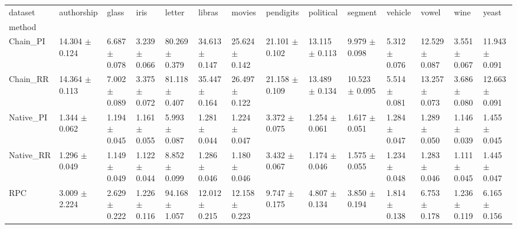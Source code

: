 \begin{tabular}{llllllllllllll}
\toprule
dataset &            authorship &                glass &                 iris &                letter &                libras &                movies &             pendigits &             political &               segment &              vehicle &                 vowel &                 wine &                 yeast \\
method    &                       &                      &                      &                       &                       &                       &                       &                       &                       &                      &                       &                      &                       \\
\midrule
Chain_PI  &  14.304 $ \pm $ 0.124 &  6.687 $ \pm $ 0.078 &  3.239 $ \pm $ 0.066 &  80.269 $ \pm $ 0.379 &  34.613 $ \pm $ 0.147 &  25.624 $ \pm $ 0.142 &  21.101 $ \pm $ 0.102 &  13.115 $ \pm $ 0.113 &   9.979 $ \pm $ 0.098 &  5.312 $ \pm $ 0.076 &  12.529 $ \pm $ 0.087 &  3.551 $ \pm $ 0.067 &  11.943 $ \pm $ 0.091 \\
Chain_RR  &  14.364 $ \pm $ 0.113 &  7.002 $ \pm $ 0.089 &  3.375 $ \pm $ 0.072 &  81.118 $ \pm $ 0.407 &  35.447 $ \pm $ 0.164 &  26.497 $ \pm $ 0.122 &  21.158 $ \pm $ 0.109 &  13.489 $ \pm $ 0.134 &  10.523 $ \pm $ 0.095 &  5.514 $ \pm $ 0.081 &  13.257 $ \pm $ 0.073 &  3.686 $ \pm $ 0.080 &  12.663 $ \pm $ 0.091 \\
Native_PI &   1.344 $ \pm $ 0.062 &  1.194 $ \pm $ 0.045 &  1.161 $ \pm $ 0.055 &   5.993 $ \pm $ 0.087 &   1.281 $ \pm $ 0.044 &   1.224 $ \pm $ 0.047 &   3.372 $ \pm $ 0.075 &   1.254 $ \pm $ 0.061 &   1.617 $ \pm $ 0.051 &  1.284 $ \pm $ 0.047 &   1.289 $ \pm $ 0.050 &  1.146 $ \pm $ 0.039 &   1.455 $ \pm $ 0.045 \\
Native_RR &   1.296 $ \pm $ 0.049 &  1.149 $ \pm $ 0.049 &  1.122 $ \pm $ 0.044 &   8.852 $ \pm $ 0.099 &   1.286 $ \pm $ 0.046 &   1.180 $ \pm $ 0.046 &   3.432 $ \pm $ 0.067 &   1.174 $ \pm $ 0.046 &   1.575 $ \pm $ 0.055 &  1.234 $ \pm $ 0.048 &   1.283 $ \pm $ 0.046 &  1.111 $ \pm $ 0.045 &   1.445 $ \pm $ 0.047 \\
RPC       &   3.009 $ \pm $ 2.224 &  2.629 $ \pm $ 0.222 &  1.226 $ \pm $ 0.116 &  94.168 $ \pm $ 1.057 &  12.012 $ \pm $ 0.215 &  12.158 $ \pm $ 0.223 &   9.747 $ \pm $ 0.175 &   4.807 $ \pm $ 0.134 &   3.850 $ \pm $ 0.194 &  1.814 $ \pm $ 0.138 &   6.753 $ \pm $ 0.178 &  1.236 $ \pm $ 0.119 &   6.165 $ \pm $ 0.156 \\

\end{tabular}
